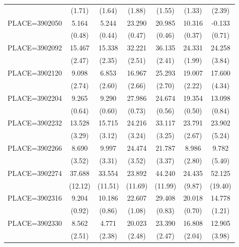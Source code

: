 {\begin{tabular}{l*{6}{c}}
                    &      (1.71)&      (1.64)&      (1.88)&      (1.55)&      (1.33)&      (2.39)\\
PLACE=3902050       &       5.164&       5.244&      23.290&      20.985&      10.316&      -0.133\\
                    &      (0.48)&      (0.44)&      (0.47)&      (0.46)&      (0.37)&      (0.71)\\
PLACE=3902092       &      15.467&      15.338&      32.221&      36.135&      24.331&      24.258\\
                    &      (2.47)&      (2.35)&      (2.51)&      (2.41)&      (1.99)&      (3.84)\\
PLACE=3902120       &       9.098&       6.853&      16.967&      25.293&      19.007&      17.600\\
                    &      (2.74)&      (2.60)&      (2.66)&      (2.70)&      (2.22)&      (4.34)\\
PLACE=3902204       &       9.265&       9.290&      27.986&      24.674&      19.354&      13.098\\
                    &      (0.64)&      (0.60)&      (0.73)&      (0.56)&      (0.50)&      (0.84)\\
PLACE=3902232       &      13.528&      15.715&      24.216&      33.117&      23.791&      23.902\\
                    &      (3.29)&      (3.12)&      (3.24)&      (3.25)&      (2.67)&      (5.24)\\
PLACE=3902266       &       8.690&       9.997&      24.474&      21.787&       8.986&       9.782\\
                    &      (3.52)&      (3.31)&      (3.52)&      (3.37)&      (2.80)&      (5.40)\\
PLACE=3902274       &      37.688&      33.554&      23.892&      44.240&      24.435&      52.125\\
                    &     (12.12)&     (11.51)&     (11.69)&     (11.99)&      (9.87)&     (19.40)\\
PLACE=3902316       &       9.204&      10.186&      22.607&      29.408&      20.018&      14.778\\
                    &      (0.92)&      (0.86)&      (1.08)&      (0.83)&      (0.70)&      (1.21)\\
PLACE=3902330       &       8.562&       4.771&      20.023&      23.390&      16.808&      12.905\\
                    &      (2.51)&      (2.38)&      (2.48)&      (2.47)&      (2.04)&      (3.98)\\

\end{tabular}}
